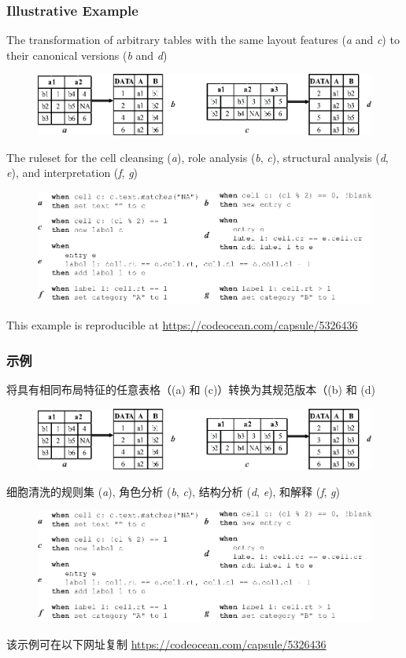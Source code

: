 \documentclass[10pt]{beamer}
\begin{document}
\begin{frame}
\frametitle{Illustrative Example}
\scriptsize{The transformation of arbitrary tables with the same layout features (\textit{a} and \textit{c}) to their canonical versions (\textit{b} and \textit{d})}
\begin{figure}
\includegraphics[width=0.7\linewidth]{illustrative_example}
\end{figure}
\scriptsize{The ruleset for the cell cleansing (\textit{a}), role analysis (\textit{b}, \textit{c}), structural analysis (\textit{d}, \textit{e}), and interpretation (\textit{f}, \textit{g})}
\begin{figure}
\includegraphics[width=0.75\linewidth]{illustrative_example_rules}
\end{figure}
\scriptsize{This example is reproducible at \url{https://codeocean.com/capsule/5326436}}
\end{frame}

\begin{frame}
\frametitle{示例}
\scriptsize{将具有相同布局特征的任意表格（(a) 和 (c)）转换为其规范版本（(b) 和 (d)}
\begin{figure}
\includegraphics[width=0.7\linewidth]{illustrative_example}
\end{figure}
\scriptsize{细胞清洗的规则集 (\textit{a}), 角色分析 (\textit{b}, \textit{c}), 结构分析 (\textit{d}, \textit{e}), 和解释 (\textit{f}, \textit{g})}
\begin{figure}
\includegraphics[width=0.75\linewidth]{illustrative_example_rules}
\end{figure}
\scriptsize{该示例可在以下网址复制 \url{https://codeocean.com/capsule/5326436}}
\end{frame}
\end{document}
